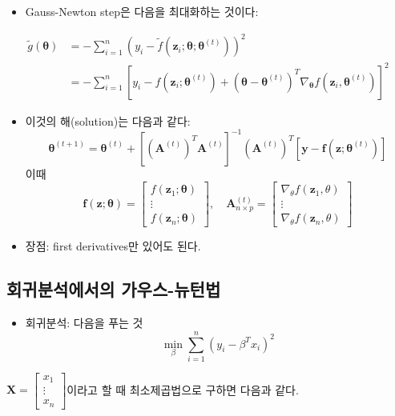 \documentclass[
  letterpaper,
  DIV=11,
  numbers=noendperiod]{scrreprt}
\providecommand{\tightlist}{%
  \setlength{\itemsep}{0pt}\setlength{\parskip}{0pt}}\usepackage{longtable,booktabs,array}
\theoremstyle{definition}
\theoremstyle{definition}
\theoremstyle{remark}
\begin{document}
\begin{itemize}
\tightlist
\item
  Gauss-Newton step은 다음을 최대화하는 것이다:
\end{itemize}

\begin{align*}
\tilde{g}(\pmb{\theta}) &= - \sum_{i=1}^n (y_i - \tilde{f}(\pmb{z}_i ; \pmb{\theta}; \pmb{\theta}^{(t)}))^2\\
&= -\sum_{i=1}^n [y_i - f(\pmb{z}_i; \pmb{\theta}^{(t)})+ (\pmb{\theta}-\pmb{\theta}^{(t)})^T\nabla_{\pmb{\theta}}f(\pmb{z}_i, \pmb{\theta}^{(t)})]^2
\end{align*}

\begin{itemize}
\item
  이것의 해(solution)는 다음과 같다: \[
  \pmb{\theta}^{(t+1)} = \pmb{\theta}^{(t)}+ [(\pmb{A}^{(t)})^T\pmb{A}^{(t)} ]^{-1}(\pmb{A}^{(t)})^T[\pmb{y} - \pmb{f}(\pmb{z}; \pmb{\theta}^{(t)})]
  \] 이때 \[
  \pmb{f}(\pmb{z}; \pmb{\theta}) = \begin{bmatrix}
  f(\pmb{z}_1;\pmb{\theta})\\
  \vdots\\
  f(\pmb{z}_n;\pmb{\theta})
  \end{bmatrix}, \quad{}
  \pmb{A}^{(t)}_{n\times p} = \begin{bmatrix}
  \nabla_{\theta} f(\pmb{z}_1, \theta)\\
  \vdots\\
  \nabla_{\theta} f(\pmb{z}_n, \theta)
  \end{bmatrix}
  \]
\item
  장점: first derivatives만 있어도 된다.
\end{itemize}

\subsection{회귀분석에서의
가우스-뉴턴법}\label{uxd68cuxadc0uxbd84uxc11duxc5d0uxc11cuxc758-uxac00uxc6b0uxc2a4-uxb274uxd134uxbc95}

\begin{itemize}
\tightlist
\item
  회귀분석: 다음을 푸는 것 \[
  \min_{\beta} \sum_{i=1}^n (y_i - \beta^T x_i)^2
  \]
\end{itemize}

\(\pmb{X} = \begin{bmatrix} x_1 \\ \vdots \\ x_n \end{bmatrix}\)이라고
할 때 최소제곱법으로 구하면 다음과 같다.
\end{document}
